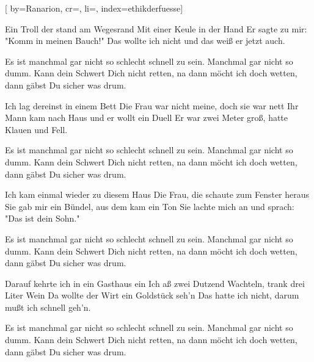 

[%
    by={Ranarion},
    cr={},
    li={},
    index={ethikderfuesse}]


    \label{ethikderfuesse}

    \beginverse\memorize[verse]
        Ein Troll der stand am Wegesrand
        Mit einer Keule in der Hand
        Er sagte zu mir: "Komm in meinen Bauch!"
        Das wollte ich nicht und das weiß er jetzt auch.
    \endverse

    \beginchorus\memorize[chorus]
        Es ist manchmal gar nicht so schlecht schnell zu sein.
        Manchmal gar nicht so dumm.
        Kann dein Schwert Dich nicht retten,
        na dann möcht ich doch wetten, dann gäbst Du sicher was drum.
    \endchorus

    \beginverse\replay[verse]
        Ich lag dereinst in einem Bett
        Die Frau war nicht meine, doch sie war nett
        Ihr Mann kam nach Haus und er wollt ein Duell
        Er war zwei Meter groß, hatte Klauen und Fell.
    \endverse

    \beginchorus\replay[chorus]
        Es ist manchmal gar nicht so schlecht schnell zu sein.
        Manchmal gar nicht so dumm.
        Kann dein Schwert Dich nicht retten,
        na dann möcht ich doch wetten, dann gäbst Du sicher was drum.
    \endchorus

    \beginverse\replay[verse]
        Ich kam einmal wieder zu diesem Haus
        Die Frau, die schaute zum Fenster heraus
        Sie gab mir ein Bündel, aus dem kam ein Ton
        Sie lachte mich an und sprach: "Das ist dein Sohn."
    \endverse

    \beginchorus\replay[chorus]
        Es ist manchmal gar nicht so schlecht schnell zu sein.
        Manchmal gar nicht so dumm.
        Kann dein Schwert Dich nicht retten,
        na dann möcht ich doch wetten, dann gäbst Du sicher was drum.
    \endchorus

    \beginverse\replay[verse]
        Darauf kehrte ich in ein Gasthaus ein
        Ich aß zwei Dutzend Wachteln, trank drei Liter Wein
        Da wollte der Wirt ein Goldstück seh'n
        Das hatte ich nicht, darum mußt ich schnell geh'n.
    \endverse

    \beginchorus\replay[chorus]
        Es ist manchmal gar nicht so schlecht schnell zu sein.
        Manchmal gar nicht so dumm.
        Kann dein Schwert Dich nicht retten,
        na dann möcht ich doch wetten, dann gäbst Du sicher was drum.
    \endchorus

